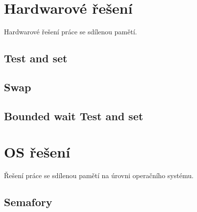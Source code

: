 \section{Hardwarové řešení}

\begin{compactitem}
    \item Hardwarové řešení práce se sdílenou pamětí.
\end{compactitem}

\subsection{Test and set}

\begin{compactitem}
    \item {}
\end{compactitem}

\subsection{Swap}

\begin{compactitem}
    \item {}
\end{compactitem}

\subsection{Bounded wait Test and set}

\begin{compactitem}
    \item {}
\end{compactitem}


\section{OS řešení}

\begin{compactitem}
    \item Řešení práce se sdílenou pamětí na úrovni operačního systému.
\end{compactitem}

\subsection{Semafory}


